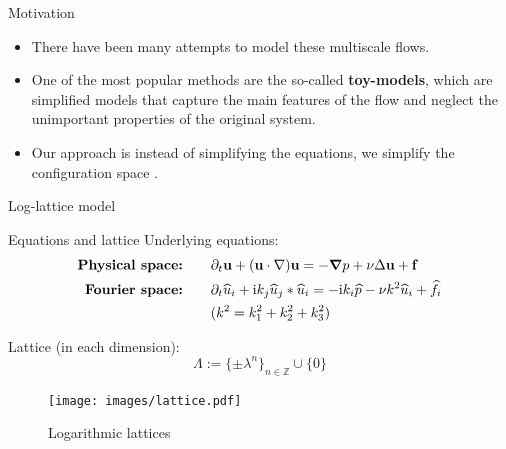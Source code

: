 \documentclass{beamer} %
\begin{document}
\begin{frame}{Motivation}
  \begin{itemize}
    \item There have been many attempts to model these multiscale flows.
    \item One of the most popular methods are the so-called \textbf{toy-models}, which are simplified models that capture the main features of the flow and neglect the unimportant properties of the original system.
    \item Our approach is instead of simplifying the equations, we simplify the configuration space \cite{campolina}.
  \end{itemize}
\end{frame}
{
\begin{frame}[plain]
  \centering\vfill\Huge
  Log-lattice model
  \vfill
\end{frame}
\addtocounter{framenumber}{-1}
}
\begin{frame}{Equations and lattice}
  Underlying equations:
  \begin{align*}
    \textbf{Physical space:}\qquad & \partial_t \boldsymbol{\mathrm{u}} + (\boldsymbol{\mathrm{u}}\cdot\nabla)\boldsymbol{\mathrm{u}} = -\grad p + \nu\Delta\boldsymbol{\mathrm{u}} + \boldsymbol{\mathrm{f}}                                             \\
    \textbf{Fourier space:}\qquad  & \partial_t \widehat{u}_i + \mathrm{i} k_j \widehat{u}_j * \widehat{u}_i = -\mathrm{i} k_i \widehat{p} - \nu k^2 \widehat{u}_i + \widehat{f}_i \\
                                   & (k^2 = k_1^2 + k_2^2 + k_3^2)
  \end{align*}

  \begin{minipage}{0.39\textwidth}
    Lattice (in each dimension):
    $$\Lambda:=\{\pm \lambda^n\}_{n\in\mathbb{Z}}\cup\{0\}$$
  \end{minipage}\hfill
  \begin{minipage}{0.59\textwidth}
    \begin{figure}
      \centering
      \texttt{[image: images/lattice.pdf]}
      \caption{Logarithmic lattices}
    \end{figure}
  \end{minipage}
\end{frame}
\end{document}
